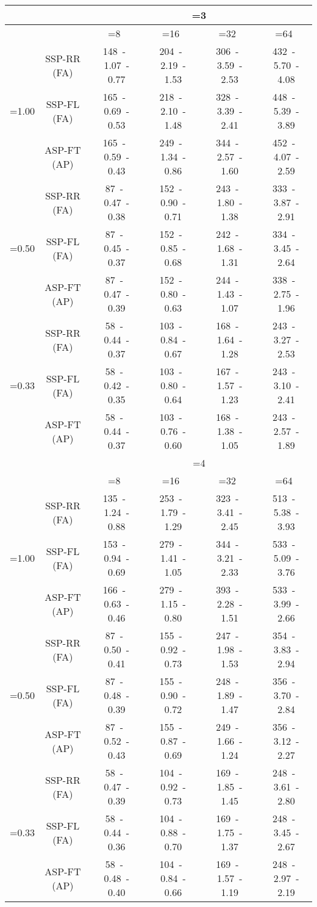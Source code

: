 \documentclass[10pt,twocolumn,journal]{IEEEtran}
\begin{document}
\begin{table*}[t!]
{\begin{tabular}{|c|c|c|c|c|c|}
\hline
\hline
& 	 & \multicolumn{4}{c|}{=3} \\
\hline
& 	 & =8 & =16 & =32 & =64 \\
\hline
\multirow{3}{*}{=1.00} & SSP-RR (FA) & 148~-~1.07~-~0.77 & 204~-~2.19~-~1.53 & 306~-~3.59~-~2.53 & 432~-~5.70~-~4.08 \\
& SSP-FL (FA) & 165~-~0.69~-~0.53 & 218~-~2.10~-~1.48 & 328~-~3.39~-~2.41 & 448~-~5.39~-~3.89 \\
& ASP-FT (AP) & 165~-~0.59~-~0.43 & 249~-~1.34~-~0.86 & 344~-~2.57~-~1.60 & 452~-~4.07~-~2.59 \\
\hline
\multirow{3}{*}{=0.50} & SSP-RR (FA) & 87~-~0.47~-~0.38 & 152~-~0.90~-~0.71 & 243~-~1.80~-~1.38 & 333~-~3.87~-~2.91 \\
& SSP-FL (FA) & 87~-~0.45~-~0.37 & 152~-~0.85~-~0.68 & 242~-~1.68~-~1.31 & 334~-~3.45~-~2.64 \\
& ASP-FT (AP) & 87~-~0.47~-~0.39 & 152~-~0.80~-~0.63 & 244~-~1.43~-~1.07 & 338~-~2.75~-~1.96 \\
\hline
\multirow{3}{*}{=0.33} & SSP-RR (FA) & 58~-~0.44~-~0.37 & 103~-~0.84~-~0.67 & 168~-~1.64~-~1.28 & 243~-~3.27~-~2.53 \\
& SSP-FL (FA) & 58~-~0.42~-~0.35 & 103~-~0.80~-~0.64 & 167~-~1.57~-~1.23 & 243~-~3.10~-~2.41 \\
& ASP-FT (AP) & 58~-~0.44~-~0.37 & 103~-~0.76~-~0.60 & 168~-~1.38~-~1.05 & 243~-~2.57~-~1.89 \\
\hline
\hline
& 	 & \multicolumn{4}{c|}{=4} \\
\hline
& 	 & =8 & =16 & =32 & =64 \\
\hline
\multirow{3}{*}{=1.00} & SSP-RR (FA) & 135~-~1.24~-~0.88 & 253~-~1.79~-~1.29 & 323~-~3.41~-~2.45 & 513~-~5.38~-~3.93 \\
& SSP-FL (FA) & 153~-~0.94~-~0.69 & 279~-~1.41~-~1.05 & 344~-~3.21~-~2.33 & 533~-~5.09~-~3.76 \\
& ASP-FT (AP) & 166~-~0.63~-~0.46 & 279~-~1.15~-~0.80 & 393~-~2.28~-~1.51 & 533~-~3.99~-~2.66 \\
\hline
\multirow{3}{*}{=0.50} & SSP-RR (FA) & 87~-~0.50~-~0.41 & 155~-~0.92~-~0.73 & 247~-~1.98~-~1.53 & 354~-~3.83~-~2.94 \\
& SSP-FL (FA) & 87~-~0.48~-~0.39 & 155~-~0.90~-~0.72 & 248~-~1.89~-~1.47 & 356~-~3.70~-~2.84 \\
& ASP-FT (AP) & 87~-~0.52~-~0.43 & 155~-~0.87~-~0.69 & 249~-~1.66~-~1.24 & 356~-~3.12~-~2.27 \\
\hline
\multirow{3}{*}{=0.33} & SSP-RR (FA) & 58~-~0.47~-~0.39 & 104~-~0.92~-~0.73 & 169~-~1.85~-~1.45 & 248~-~3.61~-~2.80 \\
& SSP-FL (FA) & 58~-~0.44~-~0.36 & 104~-~0.88~-~0.70 & 169~-~1.75~-~1.37 & 248~-~3.45~-~2.67 \\
& ASP-FT (AP) & 58~-~0.48~-~0.40 & 104~-~0.84~-~0.66 & 169~-~1.57~-~1.19 & 248~-~2.97~-~2.19 \\
\hline
\end{tabular}
}
\end{table*}
\end{document}
